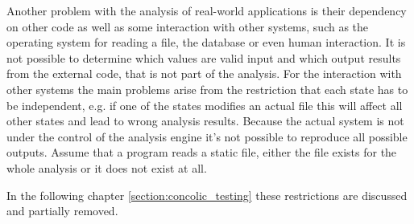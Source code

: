 Another problem with the analysis of real-world applications is their dependency on other code as well as some interaction with other systems, such as the operating system for reading a file, the database or even human interaction. It is not possible to determine which values are valid input and which output results from the external code, that is not part of the analysis. For the interaction with other systems the main problems arise from the restriction that each state has to be independent, e.g. if one of the states modifies an actual file this will affect all other states and lead to wrong analysis results. Because the actual system is not under the control of the analysis engine it's not possible to reproduce all possible outputs. Assume that a program reads a static file, either the file exists for the whole analysis or it does not exist at all.
 
In the following chapter \ref{section:concolic_testing} these restrictions are discussed and partially removed.
